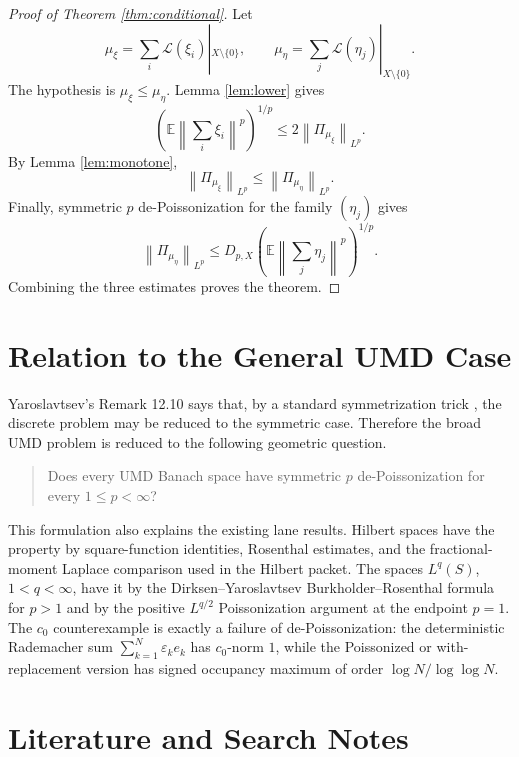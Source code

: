 \documentclass[11pt]{article}
\newcommand{\E}{\mathbb E}
\newcommand{\norm}[1]{\left\lVert #1\right\rVert}
\begin{document}
\begin{proof}[Proof of Theorem \ref{thm:conditional}]
Let
\[
  \mu_\xi=\sum_i\mathcal L(\xi_i)|_{X\setminus\{0\}},
  \qquad
  \mu_\eta=\sum_j\mathcal L(\eta_j)|_{X\setminus\{0\}}.
\]
The hypothesis is \(\mu_\xi\le\mu_\eta\).  Lemma \ref{lem:lower} gives
\[
  \left(\E\norm{\sum_i\xi_i}^p\right)^{1/p}
  \le
  2\norm{\Pi_{\mu_\xi}}_{L^p}.
\]
By Lemma \ref{lem:monotone},
\[
  \norm{\Pi_{\mu_\xi}}_{L^p}\le \norm{\Pi_{\mu_\eta}}_{L^p}.
\]
Finally, symmetric \(p\) de-Poissonization for the family \((\eta_j)\) gives
\[
  \norm{\Pi_{\mu_\eta}}_{L^p}
  \le
  D_{p,X}
  \left(\E\norm{\sum_j\eta_j}^p\right)^{1/p}.
\]
Combining the three estimates proves the theorem.
\end{proof}

\section*{Relation to the General UMD Case}

Yaroslavtsev's Remark 12.10 says that, by a standard symmetrization trick
\cite[Lemma 6.3]{LedouxTalagrand}, the discrete problem may be reduced to the
symmetric case.  Therefore the broad UMD problem is reduced to the following
geometric question.

\begin{quote}
Does every UMD Banach space have symmetric \(p\) de-Poissonization for every
\(1\le p<\infty\)?
\end{quote}

This formulation also explains the existing lane results.  Hilbert spaces have
the property by square-function identities, Rosenthal estimates, and the
fractional-moment Laplace comparison used in the Hilbert packet.  The spaces
\(L^q(S)\), \(1<q<\infty\), have it by the Dirksen--Yaroslavtsev
Burkholder--Rosenthal formula for \(p>1\) and by the positive
\(L^{q/2}\) Poissonization argument at the endpoint \(p=1\).  The \(c_0\)
counterexample is exactly a failure of de-Poissonization: the deterministic
Rademacher sum \(\sum_{k=1}^N\varepsilon_ke_k\) has \(c_0\)-norm \(1\), while
the Poissonized or with-replacement version has signed occupancy maximum of
order \(\log N/\log\log N\).

\section*{Literature and Search Notes}
\end{document}
